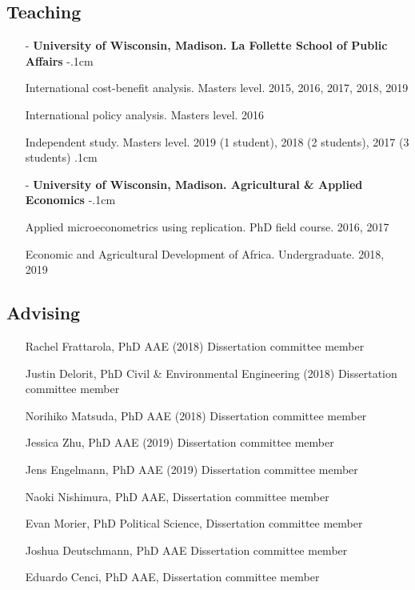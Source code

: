 \documentclass[11pt]{article}
\begin{document}
\subsection*{\sc Teaching}
\begin{itemize}[leftmargin=20pt]
    \itemsep0cm
    \item[-]\textbf{University of Wisconsin, Madison. La Follette School of Public Affairs}
    \itemsep-.1cm
    \item[] International cost-benefit analysis. Masters level. 2015, 2016, 2017, 2018, 2019
    \item[] International policy analysis. Masters level. 2016
    \item[] Independent study. Masters level. 2019 (1 student), 2018 (2 students), 2017 (3 students)
    \itemsep.1cm
    \item[-]\textbf{University of Wisconsin, Madison. Agricultural \& Applied Economics}
    \itemsep-.1cm
    \item[] Applied microeconometrics using replication. PhD field course. 2016, 2017
    \item[] Economic and Agricultural Development of Africa. Undergraduate. 2018, 2019
    
\end{itemize}

\subsection*{\sc Advising}

\begin{itemize}[leftmargin=20pt]
    \itemsep-.1cm
    \item[] Rachel Frattarola, PhD AAE (2018) Dissertation committee member
    \item[] Justin Delorit, PhD Civil \& Environmental Engineering (2018) Dissertation committee member
    \item[] Norihiko Matsuda, PhD AAE (2018) Dissertation committee member
    \item[] Jessica Zhu, PhD AAE (2019) Dissertation committee member
    \item[]	Jens Engelmann, PhD AAE (2019) Dissertation committee member
    \item[] Naoki Nishimura, PhD AAE, Dissertation committee member
    \item[]	Evan Morier, PhD Political Science, Dissertation committee member
    \item[]	Joshua Deutschmann, PhD AAE Dissertation committee member
    \item[]	Eduardo Cenci, PhD AAE, Dissertation committee member
\end{itemize}
\end{document}

